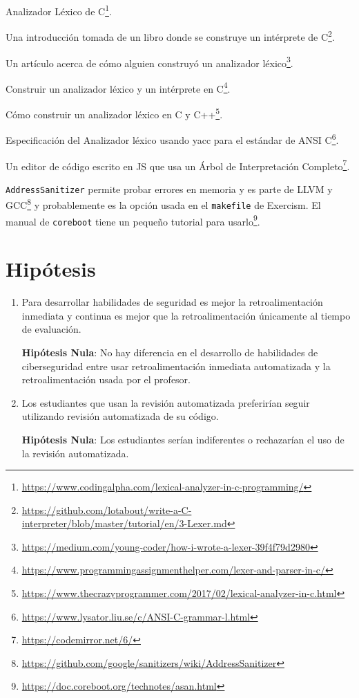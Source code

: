\documentclass[
  12,
]{scrartcl}
\DeclareRobustCommand{\href}[2]{#2\footnote{\url{#1}}}
\begin{document}
\href{https://www.codingalpha.com/lexical-analyzer-in-c-programming/}{Analizador
Léxico de C}.

\href{https://github.com/lotabout/write-a-C-interpreter/blob/master/tutorial/en/3-Lexer.md}{Una
introducción tomada de un libro donde se construye un intérprete de C}.

\href{https://medium.com/young-coder/how-i-wrote-a-lexer-39f4f79d2980}{Un
artículo acerca de cómo alguien construyó un analizador léxico}.

\href{https://www.programmingassignmenthelper.com/lexer-and-parser-in-c/}{Construir
un analizador léxico y un intérprete en C}.

\href{https://www.thecrazyprogrammer.com/2017/02/lexical-analyzer-in-c.html}{Cómo
construir un analizador léxico en C y C++}.

\href{https://www.lysator.liu.se/c/ANSI-C-grammar-l.html}{Especificación
del Analizador léxico usando yacc para el estándar de ANSI C}.

\href{https://codemirror.net/6/}{Un editor de código escrito en JS que
usa un Árbol de Interpretación Completo}.

\href{https://github.com/google/sanitizers/wiki/AddressSanitizer}{\texttt{AddressSanitizer}
permite probar errores en memoria y es parte de LLVM y GCC} y
probablemente es la opción usada en el \texttt{makefile} de Exercism.
\href{https://doc.coreboot.org/technotes/asan.html}{El manual de
\texttt{coreboot} tiene un pequeño tutorial para usarlo}.

\hypertarget{hipuxf3tesis}{%
\section{Hipótesis}\label{hipuxf3tesis}}

\begin{enumerate}
\def\labelenumi{\arabic{enumi}.}
\item
  Para desarrollar habilidades de seguridad es mejor la
  retroalimentación inmediata y continua es mejor que la
  retroalimentación únicamente al tiempo de evaluación.

  \textbf{Hipótesis Nula}: No hay diferencia en el desarrollo de
  habilidades de ciberseguridad entre usar retroalimentación inmediata
  automatizada y la retroalimentación usada por el profesor.
\item
  Los estudiantes que usan la revisión automatizada preferirían seguir
  utilizando revisión automatizada de su código.

  \textbf{Hipótesis Nula}: Los estudiantes serían indiferentes o
  rechazarían el uso de la revisión automatizada.
\end{enumerate}
\end{document}
